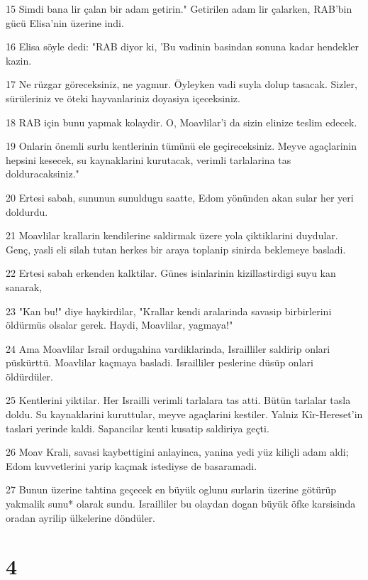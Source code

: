 \par 15 Simdi bana lir çalan bir adam getirin." Getirilen adam lir çalarken, RAB'bin gücü Elisa'nin üzerine indi.
\par 16 Elisa söyle dedi: "RAB diyor ki, 'Bu vadinin basindan sonuna kadar hendekler kazin.
\par 17 Ne rüzgar göreceksiniz, ne yagmur. Öyleyken vadi suyla dolup tasacak. Sizler, sürüleriniz ve öteki hayvanlariniz doyasiya içeceksiniz.
\par 18 RAB için bunu yapmak kolaydir. O, Moavlilar'i da sizin elinize teslim edecek.
\par 19 Onlarin önemli surlu kentlerinin tümünü ele geçireceksiniz. Meyve agaçlarinin hepsini kesecek, su kaynaklarini kurutacak, verimli tarlalarina tas dolduracaksiniz."
\par 20 Ertesi sabah, sununun sunuldugu saatte, Edom yönünden akan sular her yeri doldurdu.
\par 21 Moavlilar krallarin kendilerine saldirmak üzere yola çiktiklarini duydular. Genç, yasli eli silah tutan herkes bir araya toplanip sinirda beklemeye basladi.
\par 22 Ertesi sabah erkenden kalktilar. Günes isinlarinin kizillastirdigi suyu kan sanarak,
\par 23 "Kan bu!" diye haykirdilar, "Krallar kendi aralarinda savasip birbirlerini öldürmüs olsalar gerek. Haydi, Moavlilar, yagmaya!"
\par 24 Ama Moavlilar Israil ordugahina vardiklarinda, Israilliler saldirip onlari püskürttü. Moavlilar kaçmaya basladi. Israilliler peslerine düsüp onlari öldürdüler.
\par 25 Kentlerini yiktilar. Her Israilli verimli tarlalara tas atti. Bütün tarlalar tasla doldu. Su kaynaklarini kuruttular, meyve agaçlarini kestiler. Yalniz Kîr-Hereset'in taslari yerinde kaldi. Sapancilar kenti kusatip saldiriya geçti.
\par 26 Moav Krali, savasi kaybettigini anlayinca, yanina yedi yüz kiliçli adam aldi; Edom kuvvetlerini yarip kaçmak istediyse de basaramadi.
\par 27 Bunun üzerine tahtina geçecek en büyük oglunu surlarin üzerine götürüp yakmalik sunu* olarak sundu. Israilliler bu olaydan dogan büyük öfke karsisinda oradan ayrilip ülkelerine döndüler.

\chapter{4}

